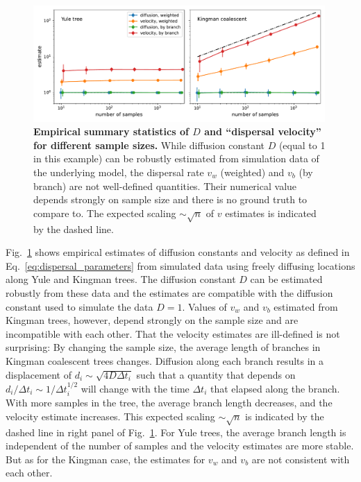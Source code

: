 \documentclass[aps,rmp, twocolumn]{revtex4}
\begin{document}
\begin{figure}[tb]
    \includegraphics*[width=0.99\textwidth]{figures/dispersal_stats.pdf}
    \caption{\label{fig:D_and_v}{\bf Empirical summary statistics of $D$ and ``dispersal velocity'' for different sample sizes.}
    While diffusion constant $D$ (equal to 1 in this example) can be robustly estimated from simulation data of the underlying model, the dispersal rate $v_w$ (weighted) and $v_b$ (by branch) are not well-defined quantities. Their numerical value depends strongly on sample size and there is no ground truth to compare to. The expected scaling $\sim \sqrt{n}$ of $v$ estimates is indicated by the dashed line.}
\end{figure}


Fig.~\ref{fig:D_and_v} shows empirical estimates of diffusion constants and velocity as defined in Eq.~\ref{eq:dispersal_parameters} from simulated data using freely diffusing locations along Yule and Kingman trees.
The diffusion constant $D$ can be estimated robustly from these data and the estimates are compatible with the diffusion constant used to simulate the data $D=1$.
Values of $v_w$ and $v_b$ estimated from Kingman trees, however, depend strongly on the sample size and are incompatible with each other.
That the velocity estimates are ill-defined is not surprising: By changing the sample size, the average length of branches in Kingman coalescent trees changes.
Diffusion along each branch results in a displacement of $d_i \sim \sqrt{4D\Delta t_i}$ such that a quantity that depends on $d_i / \Delta t_i \sim 1/\Delta t_i^{1/2}$ will change with the time $\Delta t_i$ that elapsed along the branch.
With more samples in the tree, the average branch length decreases, and the velocity estimate increases.
This expected scaling $\sim \sqrt{n}$ is indicated by the dashed line in right panel of Fig.~\ref{fig:D_and_v}.
For Yule trees, the average branch length is independent of the number of samples and the velocity estimates are more stable.
But as for the Kingman case, the estimates for $v_w$ and $v_b$ are not consistent with each other.
\end{document}
